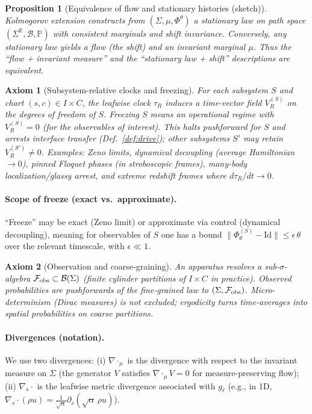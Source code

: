 \documentclass[11pt]{article}
\newtheorem{axiom}{Axiom}
\newtheorem{proposition}{Proposition}
\newcommand{\R}{\mathbb{R}}
\begin{document}
\begin{proposition}[Equivalence of flow and stationary histories (sketch)]
Kolmogorov extension constructs from $(\Sigma,\mu,\Phi^\theta)$ a stationary law on path space $(\Sigma^\R,\mathcal B,\mathbb P)$ with consistent marginals and shift invariance.
Conversely, any stationary law yields a flow (the shift) and an invariant marginal $\mu$.
Thus the ``flow + invariant measure'' and the ``stationary law + shift'' descriptions are equivalent.
\end{proposition}

\begin{axiom}[Subsystem-relative clocks and freezing]\label{ax:freeze}
For each subsystem $S$ and chart $(s,c)\in I\times C$, the leafwise clock $\tau_R$ induces a time-vector field $V_R^{(S)}$ on the degrees of freedom of $S$.
\emph{Freezing $S$} means an operational regime with $V_R^{(S)}=0$ (for the observables of interest). This halts pushforward for $S$ and arrests interface transfer (Def.~\ref{def:drive}); other subsystems $S'$ may retain $V_R^{(S')}\neq 0$.
Examples: Zeno limits, dynamical decoupling (average Hamiltonian $\to 0$), pinned Floquet phases (in stroboscopic frames), many-body localization/glassy arrest, and extreme redshift frames where $d\tau_R/dt\to 0$.
\end{axiom}

\paragraph{Scope of freeze (exact vs.\ approximate).}
``Freeze'' may be exact (Zeno limit) or approximate via control (dynamical decoupling), meaning for observables of $S$ one has a bound $\|\Phi_\theta^{(S)}-\mathrm{Id}\|\le \epsilon\,\theta$ over the relevant timescale, with $\epsilon\ll 1$.

\begin{axiom}[Observation and coarse-graining]
An apparatus resolves a sub-$\sigma$-algebra $\mathcal F_{\rm obs}\subset\mathcal B(\Sigma)$ (finite cylinder partitions of $I\times C$ in practice). Observed probabilities are pushforwards of the fine-grained law to $(\Sigma,\mathcal F_{\rm obs})$. Micro-determinism (Dirac measures) is not excluded; ergodicity turns time-averages into spatial probabilities on coarse partitions.
\end{axiom}

\paragraph{Divergences (notation).}
We use two divergences:
(i) $\nabla\!\cdot_{\mu}$ is the divergence with respect to the invariant measure on $\Sigma$
(the generator $V$ satisfies $\nabla\!\cdot_{\mu}V=0$ for measure-preserving flow);
(ii) $\nabla_s\!\cdot$ is the leafwise metric divergence associated with $g_\ell$ (e.g., in 1D, $\nabla_s\!\cdot(\rho u)=\frac{1}{\sqrt{\alpha}}\partial_s(\sqrt{\alpha}\,\rho u)$).
\end{document}
